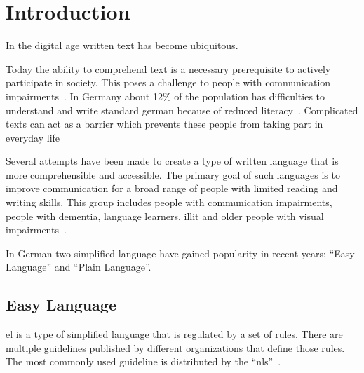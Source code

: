 \chapter{Introduction}\label{ch:introduction}

In the digital age written text has become ubiquitous. %

Today the ability to comprehend text is a necessary prerequisite to actively participate in society. %
This poses a challenge to people with communication impairments~\autocite{easyLanguageBook}.
In Germany about 12\% of the population has difficulties to understand and write standard german because of reduced literacy~\autocite{schomacker2023data}.
Complicated texts can act as a barrier which prevents these people from taking part in everyday life~\autocite{easyLanguageBook}

Several attempts have been made to create a type of written language that is more comprehensible and accessible.
The primary goal of such languages is to improve communication for a broad range of people with limited reading and writing skills.
This group includes people with communication impairments, people with dementia, language learners, \gls{illit} and older people with visual impairments~\autocite{easyLanguageBook}.

In German two simplified language have gained popularity in recent years: \enquote{Easy Language} and \enquote{Plain Language}.


\section{Easy Language}\label{sec:el}

\gls{el} is a type of simplified language that is regulated by a set of rules.
There are multiple guidelines published by different organizations that define those rules.
The most commonly used guideline is distributed by the \enquote{\gls{nls}}~\autocite{netzwerkLS, easyLanguageBook}.

